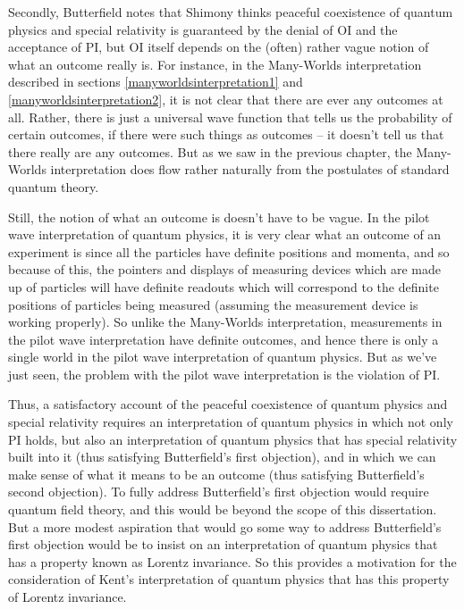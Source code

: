 Secondly,  Butterfield notes that Shimony thinks peaceful coexistence of quantum physics and special relativity is guaranteed by the denial of OI and the acceptance of PI, but OI itself depends on the (often) rather vague notion of what an outcome really is. For instance, in the Many-Worlds interpretation described in sections \ref{manyworldsinterpretation1} and \ref{manyworldsinterpretation2}, it is not clear that there are ever any outcomes at all. Rather, there is just a universal wave function that tells us the probability of certain outcomes, if there were such things as outcomes -- it doesn't tell us that there really are any outcomes. But as we saw in the previous chapter, the Many-Worlds interpretation does flow rather naturally from the postulates of standard quantum theory. 

Still, the notion of what an outcome is doesn't have to be vague. In the pilot wave interpretation of quantum physics, it is very clear what an outcome of an experiment is since all the particles have definite positions and momenta, and so because of this, the pointers and displays of measuring devices which are made up of particles will have definite readouts which will correspond to the definite positions of particles being measured (assuming the measurement device is working properly). So unlike the Many-Worlds interpretation, measurements in the pilot wave interpretation have definite outcomes, and hence there is only a single world in the pilot wave interpretation of quantum physics. But as we've just seen, the problem with the pilot wave interpretation is the violation of PI.  

Thus, a satisfactory account of the peaceful coexistence of quantum physics and special relativity requires an interpretation of quantum physics in which not only PI holds, but also an interpretation of quantum physics that has special relativity built into it (thus satisfying Butterfield's first objection), and in which we can make sense of what it means to be an outcome (thus satisfying Butterfield's second objection). To fully address Butterfield's first objection would require quantum field theory, and this would be beyond the scope of this dissertation. But a more modest aspiration that would go some way to address Butterfield's first objection would be to insist on an interpretation of quantum physics that has a property known as Lorentz invariance. So this provides a motivation for the consideration of Kent's interpretation of quantum physics that has this property of Lorentz invariance.